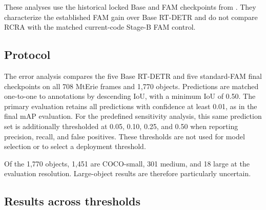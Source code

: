 These analyses use the historical locked Base and FAM checkpoints from
. They characterize the established FAM gain over
Base RT-DETR and do not compare RCRA with the matched
current-code Stage-B FAM control.

\subsection{Protocol}

The error analysis compares the five Base RT-DETR and five standard-FAM final
checkpoints on all 708 MtErie frames and 1,770 objects. Predictions are matched
one-to-one to annotations by descending IoU, with a minimum IoU of 0.50.
The primary evaluation retains all predictions with confidence at least 0.01,
as in the final mAP evaluation.
For the predefined sensitivity analysis, this same prediction set is
additionally thresholded at 0.05, 0.10, 0.25, and 0.50 when reporting
precision, recall, and false positives. These thresholds are not used for model
selection or to select a deployment threshold.

Of the 1,770 objects, 1,451 are COCO-small, 301 medium, and 18 large at the
evaluation resolution. Large-object results are therefore particularly
uncertain.

\subsection{Results across thresholds}

